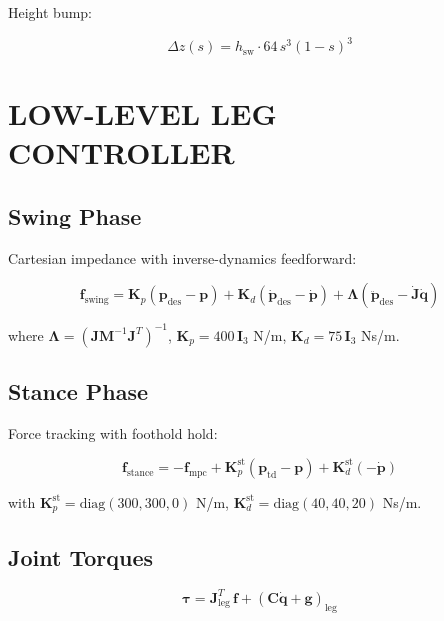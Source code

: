\documentclass[11pt,a4paper]{article}
\begin{document}
Height bump:

\begin{equation}
\Delta z(s) = h_{\text{sw}} \cdot 64\,s^3(1 - s)^3
\end{equation}

\section{LOW-LEVEL LEG CONTROLLER}

\subsection{Swing Phase}

Cartesian impedance with inverse-dynamics feedforward:

\begin{equation}
\mathbf{f}_{\text{swing}} = \mathbf{K}_p(\mathbf{p}_{\text{des}} - \mathbf{p}) + \mathbf{K}_d(\dot{\mathbf{p}}_{\text{des}} - \dot{\mathbf{p}}) + \boldsymbol{\Lambda}(\ddot{\mathbf{p}}_{\text{des}} - \dot{\mathbf{J}}\dot{\mathbf{q}})
\end{equation}

where $\boldsymbol{\Lambda} = (\mathbf{J}\mathbf{M}^{-1}\mathbf{J}^T)^{-1}$, $\mathbf{K}_p = 400\,\mathbf{I}_3$ N/m, $\mathbf{K}_d = 75\,\mathbf{I}_3$ Ns/m.

\subsection{Stance Phase}

Force tracking with foothold hold:

\begin{equation}
\mathbf{f}_{\text{stance}} = -\mathbf{f}_{\text{mpc}} + \mathbf{K}_p^{\text{st}}(\mathbf{p}_{\text{td}} - \mathbf{p}) + \mathbf{K}_d^{\text{st}}(-\dot{\mathbf{p}})
\end{equation}

with $\mathbf{K}_p^{\text{st}} = \text{diag}(300, 300, 0)$ N/m, $\mathbf{K}_d^{\text{st}} = \text{diag}(40, 40, 20)$ Ns/m.

\subsection{Joint Torques}

\begin{equation}
\boldsymbol{\tau} = \mathbf{J}_{\text{leg}}^T\,\mathbf{f} + (\mathbf{C}\dot{\mathbf{q}} + \mathbf{g})_{\text{leg}}
\end{equation}
\end{document}
